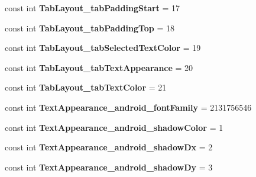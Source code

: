 \begin{DoxyCompactItemize}
const int {\bfseries Tab\+Layout\+\_\+tab\+Padding\+Start} = 17
\item 
\mbox{\label{classst_delivery_1_1_resource_1_1_styleable_ae62ba2aa3d050605f107eda012555578}} 
const int {\bfseries Tab\+Layout\+\_\+tab\+Padding\+Top} = 18
\item 
\mbox{\label{classst_delivery_1_1_resource_1_1_styleable_a4a870536d548016d939c40614e97550e}} 
const int {\bfseries Tab\+Layout\+\_\+tab\+Selected\+Text\+Color} = 19
\item 
\mbox{\label{classst_delivery_1_1_resource_1_1_styleable_af79cf5ae848912d9a96d28117cdae269}} 
const int {\bfseries Tab\+Layout\+\_\+tab\+Text\+Appearance} = 20
\item 
\mbox{\label{classst_delivery_1_1_resource_1_1_styleable_ac5d932e8920930baa264061a3bb6759d}} 
const int {\bfseries Tab\+Layout\+\_\+tab\+Text\+Color} = 21
\item 
\mbox{\label{classst_delivery_1_1_resource_1_1_styleable_a6e61a20120bab94d47c1d3d42900a07a}} 
const int {\bfseries Text\+Appearance\+\_\+android\+\_\+font\+Family} = 2131756546
\item 
\mbox{\label{classst_delivery_1_1_resource_1_1_styleable_a8cc4855c90979c83fbe350bbb3ca6106}} 
const int {\bfseries Text\+Appearance\+\_\+android\+\_\+shadow\+Color} = 1
\item 
\mbox{\label{classst_delivery_1_1_resource_1_1_styleable_af2d39e061a8dddeece988bd35a0285df}} 
const int {\bfseries Text\+Appearance\+\_\+android\+\_\+shadow\+Dx} = 2
\item 
\mbox{\label{classst_delivery_1_1_resource_1_1_styleable_a51a80138d83151daf57db8da22d44dc9}} 
const int {\bfseries Text\+Appearance\+\_\+android\+\_\+shadow\+Dy} = 3
\item 
\mbox{\label{classst_delivery_1_1_resource_1_1_styleable_a679226b3bc40b76bea283c5108cbf1de}} 

\end{DoxyCompactItemize}
